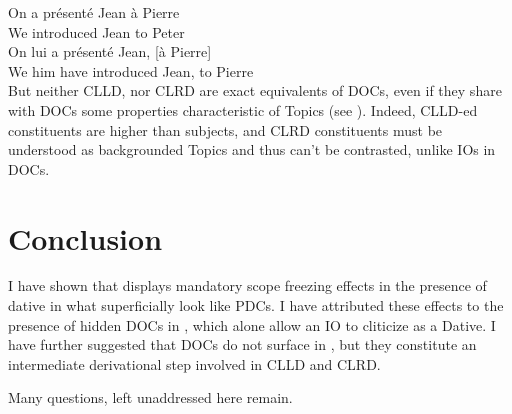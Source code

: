 \documentclass[output=paper]{langsci/langscibook}
\begin{document}
\ea \label{clrd}
\ea
	\gll  On              a   pr\'{e}sent\'{e}     Jean \`a Pierre \\
    We  {} introduced Jean to Peter\\
\ex
	\gll  On      lui        a   pr\'{e}sent\'{e}    Jean,  [\`a Pierre] \\
         We  him\tss{\Dat} have introduced     Jean, to Pierre \\
\z
\z
%
But neither CLLD, nor \gls{CLRD} are exact
equivalents of \glspl{DOC}, even if they share with \glspl{DOC} some properties
characteristic of Topics (see \citealt{Polinsky:1996}). Indeed, \gls{CLLD}-ed
constituents are higher than subjects, and \gls{CLRD} constituents must be understood as backgrounded Topics and thus
can't be contrasted, unlike \glspl{IO} in \glspl{DOC}.

\section{Conclusion}

I have shown that  displays mandatory scope freezing effects in the
presence of dative  in what superficially look like \glspl{PDC}. I have
attributed these effects to the presence of hidden \glspl{DOC} in , which
alone allow an IO to cliticize as a Dative. I have further suggested that
\glspl{DOC} do not surface in , but they constitute an intermediate
derivational step  involved in \gls{CLLD} and
\gls{CLRD}.

Many questions, left unaddressed  here remain.
\end{document}
